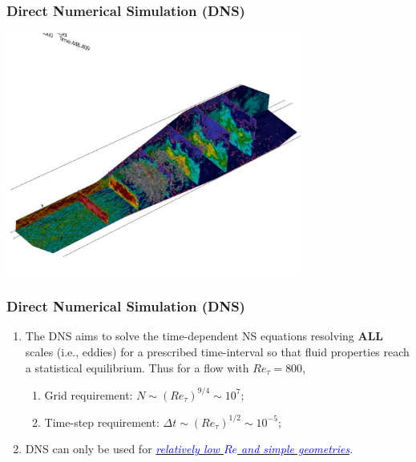 \documentclass[10pt,compress]{beamer}
\newcommand{\blue}{\textcolor{blue}}
\begin{document}
\begin{frame}
 \frametitle{Direct Numerical Simulation (DNS)}
      \begin{center}
        \includegraphics[width=9.cm, height=8cm, clip]{./Figs/DNS_Exampleb}
      \end{center}
\end{frame}


\begin{frame}
 \frametitle{Direct Numerical Simulation (DNS)}
    \begin{enumerate}
       \item<1-> The DNS aims to solve the time-dependent NS equations resolving {\bf ALL} scales (i.e., eddies) for a prescribed time-interval so that fluid properties reach a statistical equilibrium. Thus for a flow with $Re_{\tau}=800$,
          \begin{enumerate}
            \item<1-> Grid requirement: $N\sim\left(Re_{\tau}\right)^{9/4}\sim 10^{7}$;
            \item<1-> Time-step requirement: $\Delta t\sim \left(Re_{\tau}\right)^{1/2}\sim 10^{-5}$;
          \end{enumerate}
       \item<2-> DNS can only be used for \underline{\blue{\it relatively low $Re$ and simple geometries}}.
    \end{enumerate} 
\end{frame}
\end{document}
